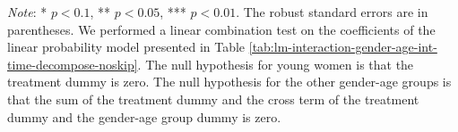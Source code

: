 \documentclass[12pt, a4paper]{article}
\begin{document}
\begin{table}[H]
\begin{threeparttable}
\begin{tabular}[t]{llcccccc}
\end{tabular}
\begin{tablenotes}
\item \emph{Note}: * $p < 0.1$, ** $p < 0.05$, *** $p < 0.01$. The robust standard errors are in parentheses. We performed a linear combination test on the coefficients of the linear probability model presented in Table \ref{tab:lm-interaction-gender-age-int-time-decompose-noskip}. The null hypothesis for young women is that the treatment dummy is zero. The null hypothesis for the other gender-age groups is that the sum of the treatment dummy and the cross term of the treatment dummy and the gender-age group dummy is zero.
\end{tablenotes}
\end{threeparttable}
\end{table}
\end{document}
